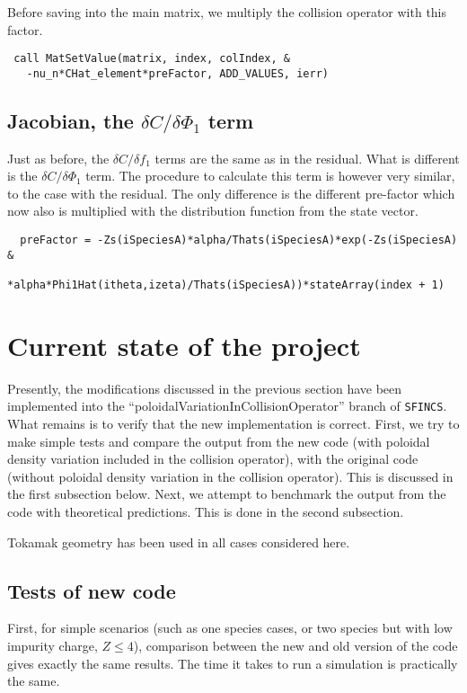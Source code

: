 \documentclass[12pt]{article}
\begin{document}
Before saving into the main matrix, we multiply the collision operator with this factor.

 \begin{lstlisting}
 call MatSetValue(matrix, index, colIndex, & 
   -nu_n*CHat_element*preFactor, ADD_VALUES, ierr)
  \end{lstlisting}

\subsection*{Jacobian, the $\delta C/\delta \Phi_1$ term}
Just as before, the   $\delta C/\delta f_1$ terms are the same as in the residual. What is different is the $\delta C/\delta \Phi_1$  term. The procedure to calculate this term is however very similar, to the case with the residual. The only difference is the different pre-factor which now also is multiplied with the distribution function from the state vector.

 \begin{lstlisting}
  preFactor = -Zs(iSpeciesA)*alpha/Thats(iSpeciesA)*exp(-Zs(iSpeciesA) &
            *alpha*Phi1Hat(itheta,izeta)/Thats(iSpeciesA))*stateArray(index + 1)
  \end{lstlisting}

\section*{Current state of the project}
Presently, the modifications discussed in the previous section have been implemented into the ``poloidalVariationInCollisionOperator'' branch of \texttt{SFINCS}. What remains is to verify that the new implementation is correct. First, we try to make simple tests and compare the output from the new code (with poloidal density variation included in the collision operator), with the original code (without poloidal density variation in the collision operator). This is discussed in the first subsection below. Next, we attempt to benchmark the output from the code with theoretical predictions. This is done in the second subsection. 

Tokamak geometry has been used in all cases considered here.

\subsection*{Tests of new code}
First, for simple scenarios (such as one species cases, or two species but with low impurity charge, $Z \le 4$), comparison between the new and old version of the code gives exactly the same results. The time it takes to run a simulation is practically the same.  
\end{document}
